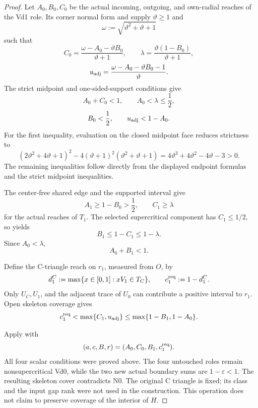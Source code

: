 \begin{proof}
Let \(A_0,B_0,C_0\) be the actual incoming, outgoing, and own-radial
reaches of the Vd1 role.  Its corner normal form and  supply
\(\vartheta\ge1\) and
\[
 \omega:=\sqrt{\vartheta^2+\vartheta+1}
\]
such that
\[
 C_0=\frac{\omega-A_0-\vartheta B_0}{\vartheta+1},
 \qquad
 \lambda=\frac{\vartheta(1-B_0)}{\vartheta+1},
\]
\[
 u_{\rm adj}
 =\frac{\omega-A_0-\vartheta B_0-1}{\vartheta}.
\]
The strict midpoint and one-sided-support conditions give
\[
 A_0+C_0<1,
 \qquad
 A_0<\lambda\le\frac12,
\]
\[
 B_0<\frac12,
 \qquad
 u_{\rm adj}<1-A_0.
\]
For the first inequality, evaluation on the closed midpoint face reduces
strictness to
\[
 (2\vartheta^2+4\vartheta+1)^2
 -4(\vartheta+1)^2(\vartheta^2+\vartheta+1)
 =4\vartheta^3+4\vartheta^2-4\vartheta-3>0.
\]
The remaining inequalities follow directly from the displayed endpoint
formulas and the strict midpoint inequalities.

The center-free shared edge and the supported interval give
\[
 A_1\ge1-B_0>\frac12,
 \qquad
 C_1\ge\lambda
\]
for the actual reaches of \(T_1\).  The selected supercritical component
has \(C_1\le1/2\), so
 yields
\[
 B_1\le1-C_1\le1-\lambda.
\]
Since \(A_0<\lambda\),
\[
 A_0+B_1<1.
\]

Define the C-triangle reach on \(r_1\), measured from \(O\), by
\[
 d_1^C:=\max\{x\in[0,1]:xV_1\in T_C\},
 \qquad
 c_1^{\rm req}:=1-d_1^C.
\]
Only \(U_C,U_1\), and the adjacent trace of \(U_0\) can contribute a
positive interval to \(r_1\).  Open skeleton coverage gives
\[
 c_1^{\rm req}<\max\{C_1,u_{\rm adj}\}
 \le\max\{1-B_1,1-A_0\}.
\]

Apply  with
\[
 (a,c,B,r)=(A_0,C_0,B_1,c_1^{\rm req}).
\]
All four scalar conditions were proved above. The four untouched roles
remain nonsupercritical Vd0, while the two new actual boundary sums are
$1-\varepsilon<1$. The resulting skeleton cover contradicts N0.
The original C triangle is fixed; its class and the input gap rank were
not used in the construction. This operation does not claim to preserve
coverage of the interior of $H$.
\end{proof}
